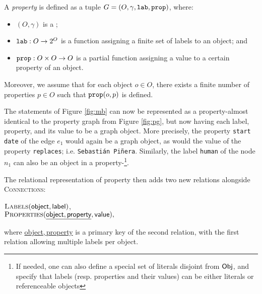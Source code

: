 \begin{definition}
 A \emph{property \data} is defined as a tuple $G=(O,\gamma,\texttt{lab},\texttt{prop})$, where:
\begin{itemize}
    \item $(O,\gamma)$ is a \data;
    \item $\texttt{lab} : O \rightarrow 2^O$ is a function
    assigning a finite set of labels to an object; and
    \item $\texttt{prop} : O \times O \rightarrow O$ is a partial function assigning a value to a certain property of an object. 
\end{itemize}
Moreover, we assume that for each object $o \in O$, there exists a finite number of properties $p \in O$ such that $\texttt{prop}(o,p)$ is defined.
\end{definition}

The statements of Figure \ref{fig:mb} can now be represented as a property-\data almost identical to the property graph from Figure \ref{fig:pg}, but now having each label, property, and its value to be a graph object. More precisely, the property \texttt{start date} of the edge $e_1$ would again be a graph object, as would the value of the property \texttt{replaces}; i.e. \texttt{Sebasti\'an Pi\~nera}. Similarly, the label \texttt{human} of the node $n_1$ can also be an object in a property-\data\footnote{If needed, one can also define a special set of literals disjoint from $\mathsf{Obj}$, and specify that labels (resp. properties and their values) can be either literals or referenceable objects}. %

 The relational representation of property \data then adds two new relations alongside \textsc{Connections}:
\begin{center}
$\textsc{Labels}(\textsf{object},\textsf{label})$,\\
$\textsc{Properties}(\underline{\textsf{object},\textsf{property}},\textsf{value}),$
\end{center}
%
where \underline{\textsf{object},\,\textsf{property}} is a primary key of the second relation, with the first relation allowing multiple labels per object.


